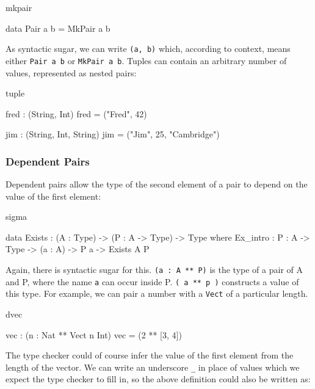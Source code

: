 \begin{SaveVerbatim}{mkpair}

data Pair a b = MkPair a b

\end{SaveVerbatim}

\noindent
As syntactic sugar, we can write \texttt{(a, b)} which, according to context,
means either \texttt{Pair a b} or \texttt{MkPair a b}.
Tuples can contain an arbitrary number of values, represented as nested pairs:

\begin{SaveVerbatim}{tuple}

fred : (String, Int)
fred = ("Fred", 42)

jim : (String, Int, String)
jim = ("Jim", 25, "Cambridge")

\end{SaveVerbatim}

\subsubsection*{Dependent Pairs}

Dependent pairs allow the type of the second element of a pair to depend on
the value of the first element:

\begin{SaveVerbatim}{sigma}

data Exists : (A : Type) -> (P : A -> Type) -> Type where
   Ex_intro : {P : A -> Type} -> (a : A) -> P a -> Exists A P

\end{SaveVerbatim}

\noindent
Again, there is syntactic sugar for this. \texttt{(a : A ** P)} is the type of a pair of
A and P, where the name \texttt{a} can occur inside P. \texttt{( a ** p )} 
constructs a value of this type. For example, we can pair a number with a 
\texttt{Vect} of a particular length.

\begin{SaveVerbatim}{dvec}

vec : (n : Nat ** Vect n Int)
vec = (2 ** [3, 4])

\end{SaveVerbatim}

\noindent
The type checker could of course infer the value of the first element from the
length of the vector. We can write an underscore \texttt{\_} in place of values which we
expect the type checker to fill in, so the above definition could also be
written as:

